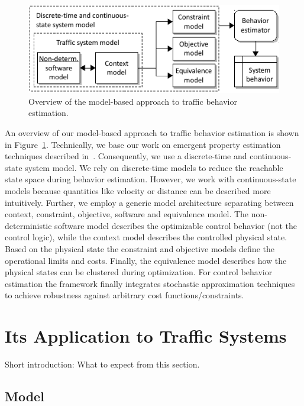 \documentclass[conference]{../cls/IEEEtran}
\begin{document}
\begin{figure}[b]
	\centering
	\includegraphics{../gfx/framework.pdf}
	\caption{Overview of the model-based approach to traffic behavior estimation.}
	\label{fig:framework}
\end{figure}
An overview of our model-based approach to traffic behavior estimation is shown in Figure~\ref{fig:framework}. Technically, we base our work on emergent property estimation techniques described in~\cite{Hackenberg2012}. Consequently, we use a discrete-time and continuous-state system model. We rely on discrete-time models to reduce the reachable state space during behavior estimation. However, we work with continuous-state models because quantities like velocity or distance can be described more intuitively. Further, we employ a generic model architecture separating between context, constraint, objective, software and equivalence model. The non-deterministic software model describes the optimizable control behavior (not the control logic), while the context model describes the controlled physical state. Based on the physical state the constraint and objective models define the operational limits and costs. Finally, the equivalence model describes how the physical states can be clustered during optimization. For control behavior estimation the framework finally integrates stochastic approximation techniques~\cite{Pereira1991} to achieve robustness against arbitrary cost functions/constraints.

\section{Its Application to Traffic Systems}

Short introduction: What to expect from this section.

\subsection{Model}
\end{document}
